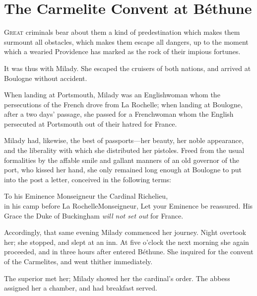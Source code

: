 
\chapter{The Carmelite Convent at Béthune}

\lettrine{G}{reat} criminals bear about them a kind of predestination which makes them surmount all obstacles, which makes them escape all dangers, up to the moment which a wearied Providence has marked as the rock of their impious fortunes. 

It was thus with Milady. She escaped the cruisers of both nations, and arrived at Boulogne without accident. 

When landing at Portsmouth, Milady was an Englishwoman whom the persecutions of the French drove from La Rochelle; when landing at Boulogne, after a two days' passage, she passed for a Frenchwoman whom the English persecuted at Portsmouth out of their hatred for France. 

Milady had, likewise, the best of passports—her beauty, her noble appearance, and the liberality with which she distributed her pistoles. Freed from the usual formalities by the affable smile and gallant manners of an old governor of the port, who kissed her hand, she only remained long enough at Boulogne to put into the post a letter, conceived in the following terms:

\begin{a4}
	\enlargethispage{2\baselineskip}
\end{a4}
\begin{mail}{To his Eminence Monseigneur the Cardinal Richelieu,\\in his camp before La Rochelle}{Monseigneur,} 
	Let your Eminence be reassured. His Grace the Duke of Buckingham \emph{will not set out} for France. 
\end{mail}

Accordingly, that same evening Milady commenced her journey. Night overtook her; she stopped, and slept at an inn. At five o'clock the next morning she again proceeded, and in three hours after entered Béthune. She inquired for the convent of the Carmelites, and went thither immediately. 

The superior met her; Milady showed her the cardinal's order. The abbess assigned her a chamber, and had breakfast served. 

